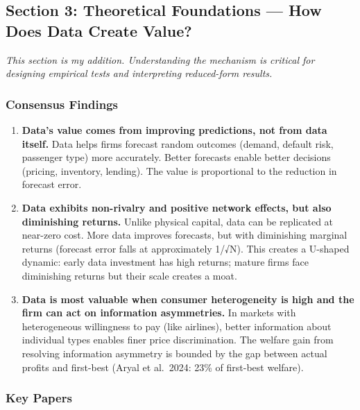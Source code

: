 \documentclass[
]{article}
\begin{document}
\hypertarget{section-3-theoretical-foundations-how-does-data-create-value}{%
\subsection{Section 3: Theoretical Foundations --- How Does Data Create
Value?}\label{section-3-theoretical-foundations-how-does-data-create-value}}

\emph{This section is my addition. Understanding the mechanism is
critical for designing empirical tests and interpreting reduced-form
results.}

\hypertarget{consensus-findings-1}{%
\subsubsection{Consensus Findings}\label{consensus-findings-1}}

\begin{enumerate}
\def\labelenumi{\arabic{enumi}.}
\item
  \textbf{Data's value comes from improving predictions, not from data
  itself.} Data helps firms forecast random outcomes (demand, default
  risk, passenger type) more accurately. Better forecasts enable better
  decisions (pricing, inventory, lending). The value is proportional to
  the reduction in forecast error.
\item
  \textbf{Data exhibits non-rivalry and positive network effects, but
  also diminishing returns.} Unlike physical capital, data can be
  replicated at near-zero cost. More data improves forecasts, but with
  diminishing marginal returns (forecast error falls at approximately
  1/√N). This creates a U-shaped dynamic: early data investment has high
  returns; mature firms face diminishing returns but their scale creates
  a moat.
\item
  \textbf{Data is most valuable when consumer heterogeneity is high and
  the firm can act on information asymmetries.} In markets with
  heterogeneous willingness to pay (like airlines), better information
  about individual types enables finer price discrimination. The welfare
  gain from resolving information asymmetry is bounded by the gap
  between actual profits and first-best (Aryal et al.~2024: 23\% of
  first-best welfare).
\end{enumerate}

\hypertarget{key-papers-1}{%
\subsubsection{Key Papers}\label{key-papers-1}}
\end{document}
